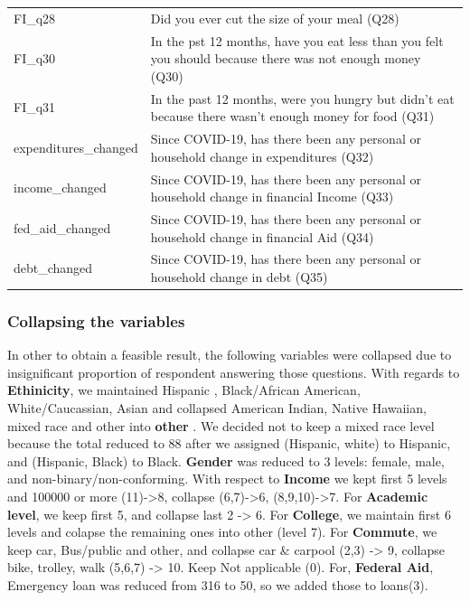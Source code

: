 \documentclass[
  10pt,
]{article}
\begin{document}
\begin{table}[H]
{\begin{tabular}[t]{ll}
FI\_q28 & Did you ever cut the size of your meal (Q28)\\
FI\_q30 & In the pst 12 months, have you eat less than you felt you should because there was not enough money (Q30)\\
FI\_q31 & In the past 12 months, were you hungry but didn't eat because there wasn't enough money for food (Q31)\\
expenditures\_changed & Since COVID-19, has there been any personal or household change in expenditures (Q32)\\
income\_changed & Since COVID-19, has there been any personal or household change in financial Income (Q33)\\
fed\_aid\_changed & Since COVID-19, has there been any personal or household change in financial Aid (Q34)\\
debt\_changed & Since COVID-19, has there been any personal or household change in debt (Q35)\\
\bottomrule
\end{tabular}}
\end{table}

\subsubsection{Collapsing the variables}

In other to obtain a feasible result, the following variables were collapsed due to insignificant proportion of respondent answering those questions. With regards to \textbf{Ethinicity}, we maintained Hispanic , Black/African American, White/Caucassian, Asian and collapsed American Indian, Native Hawaiian, mixed race and other into \textbf{other} . We decided not to keep a mixed race level because the total reduced to 88 after we assigned (Hispanic, white) to Hispanic, and (Hispanic, Black) to Black. \textbf{Gender} was reduced to 3 levels: female, male, and non-binary/non-conforming. With respect to \textbf{Income} we kept first 5 levels and 100000 or more (11)-\textgreater8, collapse (6,7)-\textgreater6, (8,9,10)-\textgreater7. For \textbf{Academic level}, we keep first 5, and collapse last 2 -\textgreater{} 6. For \textbf{College}, we maintain first 6 levels and colapse the remaining ones into other (level 7). For \textbf{Commute}, we keep car, Bus/public and other, and collapse car \& carpool (2,3) -\textgreater{} 9, collapse bike, trolley, walk (5,6,7) -\textgreater{} 10. Keep Not applicable (0). For, \textbf{Federal Aid}, Emergency loan was reduced from 316 to 50, so we added those to loans(3).
\end{document}
